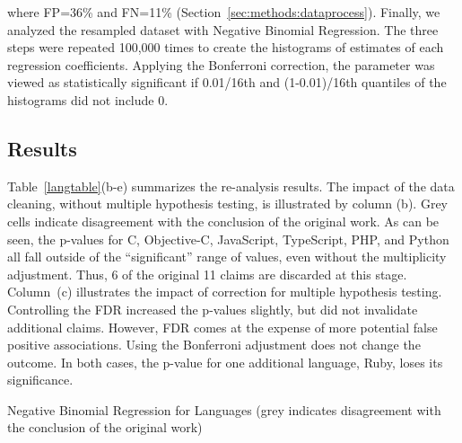 \documentclass[acmsmall]{acmart}
\renewcommand{\c}{{\sf  C}\xspace}
\newcommand{\objc}{{\sf  Objective-C}\xspace}
\newcommand{\python}{{\sf  Python}\xspace}
\newcommand{\ruby}{{\sf  Ruby}\xspace}
\newcommand{\ts}{{\sf  TypeScript}\xspace}
\newcommand{\js}{{\sf  JavaScript}\xspace}
\newcommand{\php}{{\sf  PHP}\xspace}
\begin{document}
\vspace{-5mm}

\noindent where FP=36\% and FN=11\% (Section~\ref{sec:methods:dataprocess}).
Finally, we analyzed the resampled dataset with Negative Binomial
Regression. The three steps were repeated 100,000 times to create the
histograms of estimates of each regression coefficients. Applying the
Bonferroni correction, the parameter was viewed as statistically significant
if 0.01/16th and (1-0.01)/16th quantiles of the histograms did not include  0.


\subsection{Results}

Table~\ref{langtable}(b-e) summarizes the re-analysis results. The impact of
the data cleaning, without multiple hypothesis testing, is illustrated by
column (b). Grey cells indicate disagreement with the conclusion of the
original work. As can be seen, the p-values for \c, \objc, \js, \ts, \php,
and \python all fall outside of the ``significant'' range of values, even
without the multiplicity adjustment. Thus, 6 of the original 11 claims are
discarded at this stage.  Column~(c) illustrates the impact of correction
for multiple hypothesis testing. Controlling the FDR increased the p-values
slightly, but did not invalidate additional claims. However, FDR comes at
the expense of more potential false positive associations. Using the
Bonferroni adjustment does not change the outcome.  In both cases, the
p-value for one additional language, \ruby, loses its significance.

\begin{table}[h]\begin{minipage}[t]{\textwidth}{\centering
\caption{Negative Binomial Regression for Languages (grey indicates
  disagreement with the conclusion of the original work)}
\renewcommand{\G}{\cellcolor{gray!25}}
\label{langtable}}
\end{minipage}\end{table}
\end{document}
